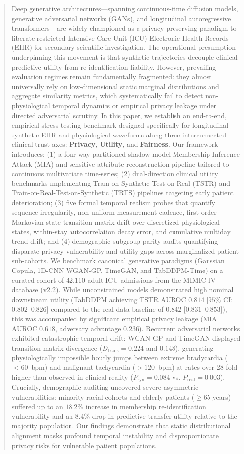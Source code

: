 \documentclass[journal]{IEEEtran}
\begin{document}
\begin{abstract}
Deep generative architectures---spanning continuous-time diffusion models, generative adversarial networks (GANs), and longitudinal autoregressive transformers---are widely championed as a privacy-preserving paradigm to liberate restricted Intensive Care Unit (ICU) Electronic Health Records (EHR) for secondary scientific investigation. The operational presumption underpinning this movement is that synthetic trajectories decouple clinical predictive utility from re-identification liability. However, prevailing evaluation regimes remain fundamentally fragmented: they almost universally rely on low-dimensional static marginal distributions and aggregate similarity metrics, which systematically fail to detect non-physiological temporal dynamics or empirical privacy leakage under directed adversarial scrutiny. In this paper, we establish an end-to-end, empirical stress-testing benchmark designed specifically for longitudinal synthetic EHR and physiological waveforms along three interconnected clinical trust axes: \textbf{Privacy}, \textbf{Utility}, and \textbf{Fairness}. Our framework introduces: (1) a four-way partitioned shadow-model Membership Inference Attack (MIA) and sensitive attribute reconstruction pipeline tailored to continuous multivariate time-series; (2) dual-direction clinical utility benchmarks implementing Train-on-Synthetic-Test-on-Real (TSTR) and Train-on-Real-Test-on-Synthetic (TRTS) pipelines targeting early patient deterioration; (3) five formal temporal realism probes that quantify sequence irregularity, non-uniform measurement cadence, first-order Markovian state transition matrix drift over discretized physiological states, within-stay autocorrelation decay error, and cumulative multiday trend drift; and (4) demographic subgroup parity audits quantifying disparate privacy vulnerability and utility gaps across marginalized patient sub-cohorts. We benchmark canonical generative paradigms (Gaussian Copula, 1D-CNN WGAN-GP, TimeGAN, and TabDDPM-Time) on a curated cohort of 42,110 adult ICU admissions from the MIMIC-IV database (v2.2). While unconstrained models demonstrated high nominal downstream utility (TabDDPM achieving TSTR AUROC $0.814$ [$95\%$ CI: $0.802$--$0.826$] compared to the real-data baseline of $0.842$ [$0.831$--$0.853$]), this was accompanied by significant empirical privacy leakage (MIA AUROC $0.618$, adversary advantage $0.236$). Recurrent adversarial networks exhibited catastrophic temporal drift: WGAN-GP and TimeGAN displayed transition matrix divergence ($D_{\text{trans}} = 0.224$ and $0.148$), generating physiologically impossible hourly jumps between extreme bradycardia ($<60$~bpm) and malignant tachycardia ($>120$~bpm) at rates over 28-fold higher than observed in clinical reality ($P_{\text{syn}} = 0.084$ vs. $P_{\text{real}} = 0.003$). Crucially, demographic auditing uncovered severe asymmetric vulnerabilities: minority racial cohorts and elderly patients ($\ge 65$ years) suffered up to an $18.2\%$ increase in membership re-identification vulnerability and an $8.4\%$ drop in predictive transfer utility relative to the majority population. Our findings demonstrate that static distributional alignment masks profound temporal instability and disproportionate privacy risks for vulnerable patient populations.

\end{abstract}
\end{document}
